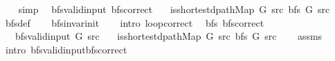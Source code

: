 \begin{isabellebody}
\ \ \isamarkupfalse%
\ simp%
\endisatagproof
{\isafoldproof}%
%
\isadelimproof
\isanewline
%
\endisadelimproof
\isanewline
{}\isamarkupfalse%
\ {\isacharparenleft}{\kern0pt}\ bfs{\isacharunderscore}{\kern0pt}valid{\isacharunderscore}{\kern0pt}input{\isacharparenright}{\kern0pt}\ bfs{\isacharunderscore}{\kern0pt}correct{\isacharcolon}{\kern0pt}\isanewline
\ \ \ {\isachardoublequoteopen}is{\isacharunderscore}{\kern0pt}shortest{\isacharunderscore}{\kern0pt}dpath{\isacharunderscore}{\kern0pt}Map\ G\ src\ {\isacharparenleft}{\kern0pt}bfs\ G\ src{\isacharparenright}{\kern0pt}{\isachardoublequoteclose}\isanewline
%
\isadelimproof
\ \ %
\endisadelimproof
%
\isatagproof
{}\isamarkupfalse%
\ bfs{\isacharunderscore}{\kern0pt}def\isanewline
\ \ \isamarkupfalse%
\ bfs{\isacharunderscore}{\kern0pt}invar{\isacharunderscore}{\kern0pt}init\isanewline
\ \ \isamarkupfalse%
\ {\isacharparenleft}{\kern0pt}intro\ loop{\isacharunderscore}{\kern0pt}correct{\isacharparenright}{\kern0pt}%
\endisatagproof
{\isafoldproof}%
%
\isadelimproof
\isanewline
%
\endisadelimproof
\isanewline
{}\isamarkupfalse%
\ {\isacharparenleft}{\kern0pt}\ bfs{\isacharparenright}{\kern0pt}\ bfs{\isacharunderscore}{\kern0pt}correct{\isacharcolon}{\kern0pt}\isanewline
\ \ \ {\isachardoublequoteopen}bfs{\isacharunderscore}{\kern0pt}valid{\isacharunderscore}{\kern0pt}input{\isacharprime}{\kern0pt}\ G\ src{\isachardoublequoteclose}\isanewline
\ \ \ {\isachardoublequoteopen}is{\isacharunderscore}{\kern0pt}shortest{\isacharunderscore}{\kern0pt}dpath{\isacharunderscore}{\kern0pt}Map\ G\ src\ {\isacharparenleft}{\kern0pt}bfs\ G\ src{\isacharparenright}{\kern0pt}{\isachardoublequoteclose}\isanewline
%
\isadelimproof
\ \ %
\endisadelimproof
%
\isatagproof
{}\isamarkupfalse%
\ assms\isanewline
\ \ \isamarkupfalse%
\ {\isacharparenleft}{\kern0pt}intro\ bfs{\isacharunderscore}{\kern0pt}valid{\isacharunderscore}{\kern0pt}input{\isachardot}{\kern0pt}bfs{\isacharunderscore}{\kern0pt}correct{\isacharparenright}{\kern0pt}%
\endisatagproof
{\isafoldproof}%
%
\isadelimproof
\isanewline
%
\endisadelimproof
%
\isadelimtheory
\isanewline
%
\endisadelimtheory
%
\isatagtheory
{}\isamarkupfalse%
%
\endisatagtheory
{\isafoldtheory}%
%
\isadelimtheory
%
\endisadelimtheory
%
\end{isabellebody}%
\endinput
